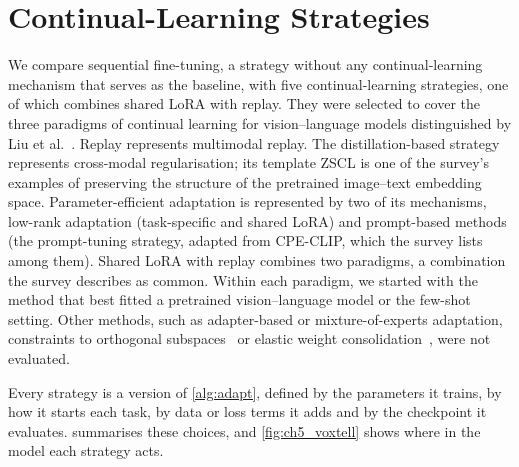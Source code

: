 \section{Continual-Learning Strategies}
\label{sec:method-strategies}

We compare sequential fine-tuning, a strategy without any continual-learning mechanism that serves as the baseline, with five continual-learning strategies, one of which combines shared LoRA with replay.
They were selected to cover the three paradigms of continual learning for vision--language models distinguished by Liu et al.~\cite[Sec.~4]{liu2026continuallearningvlmssurvey}.
Replay represents multimodal replay.
The distillation-based strategy represents cross-modal regularisation; its template ZSCL is one of the survey's examples of preserving the structure of the pretrained image--text embedding space.
Parameter-efficient adaptation is represented by two of its mechanisms, low-rank adaptation (task-specific and shared LoRA) and prompt-based methods (the prompt-tuning strategy, adapted from CPE-CLIP, which the survey lists among them).
Shared LoRA with replay combines two paradigms, a combination the survey describes as common.
Within each paradigm, we started with the method that best fitted a pretrained vision--language model or the few-shot setting.
Other methods, such as adapter-based or mixture-of-experts adaptation, constraints to orthogonal subspaces~\cite[Sec.~4]{liu2026continuallearningvlmssurvey} or elastic weight consolidation~\cite{Kirkpatrick_2017}, were not evaluated.

Every strategy is a version of \cref{alg:adapt}, defined by the parameters it trains, by how it starts each task, by data or loss terms it adds and by the checkpoint it evaluates.
 summarises these choices, and \cref{fig:ch5_voxtell} shows where in the model each strategy acts.

\begin{table}[tb]
\centering
\caption[Overview of the continual-learning strategies]{Overview of the continual-learning strategies as instances of \cref{alg:adapt}. ``Best validation'': checkpoint of the epoch with the lowest validation loss; ``last epoch'': parameters after the last epoch (\cref{sec:method-adaptation}). In every strategy, the next task starts from the parameters after the last epoch.}
\label{tab:method-strategies}

\end{table}

